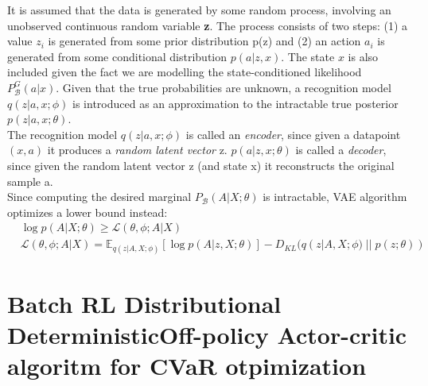 It is assumed that the data is generated by some random process, involving an unobserved continuous
random variable \textbf{z}.
The process consists of two steps: (1) a value \textbf{$z_i$} is generated from some prior distribution p(z) and (2)
an action $a_i$ is generated from some conditional distribution $p(a|z,x)$. 
The state $x$ is also included given the fact we are modelling the state-conditioned
likelihood $P_\mathcal{B}^G(a|x).$
Given that the true probabilities are unknown, a recognition model $q(z|a,x; \phi )$ is introduced
as an approximation to the intractable true posterior $p(z|a,x; \theta)$.\\
The recognition model $q(z|a,x; \phi)$ is called an \textit{encoder},  since given a datapoint $(x,a)$ it produces
a \textit{random latent vector} z.
$p(a|z,x; \theta)$ is called a \textit{decoder},
since given the random latent vector z (and state x) it reconstructs the original sample a.\\
Since computing the desired marginal $P_\mathcal{B}(A|X; \theta)$ is intractable, VAE algorithm optimizes a lower bound instead:
\begin{align}
    &\log p(A|X; \theta) \geq \mathcal{L}(\theta, \phi; A|X) \\
    &\mathcal{L}(\theta, \phi; A|X)=\mathbb E_{q(z|A,X;\phi)} [\log p(A|z,X; \theta)] - D_{KL}(q(z|A,X;\phi)\; ||\;p(z; \theta)) \label{eq:vae_loss}
\end{align}

\section{Batch RL Distributional DeterministicOff-policy Actor-critic algoritm for CVaR otpimization}

